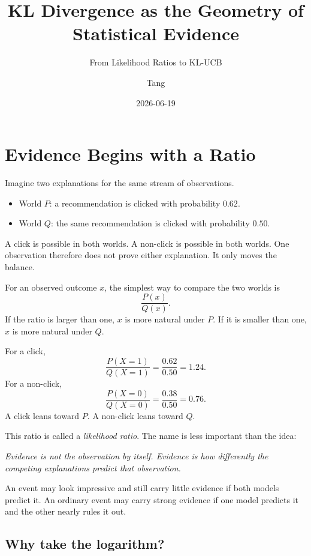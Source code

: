 \documentclass[en,nofont,11pt]{elegantbook}
\title{KL Divergence as the Geometry of Statistical Evidence}
\subtitle{From Likelihood Ratios to KL-UCB}
\author{Tang}
\institute{Tang's Machine Learning Blog}
\date{2026-06-19}
\begin{document}
\maketitle
\frontmatter
\tableofcontents
\mainmatter

\chapter{Evidence Begins with a Ratio}

Imagine two explanations for the same stream of observations.

\begin{itemize}
\item World $P$: a recommendation is clicked with probability $0.62$.
\item World $Q$: the same recommendation is clicked with probability $0.50$.
\end{itemize}

A click is possible in both worlds. A non-click is possible in both worlds. One observation therefore does not prove either explanation. It only moves the balance.

For an observed outcome $x$, the simplest way to compare the two worlds is
\[
\frac{P(x)}{Q(x)}.
\]
If the ratio is larger than one, $x$ is more natural under $P$. If it is smaller than one, $x$ is more natural under $Q$.

For a click,
\[
\frac{P(X=1)}{Q(X=1)}
=
\frac{0.62}{0.50}
=
1.24.
\]
For a non-click,
\[
\frac{P(X=0)}{Q(X=0)}
=
\frac{0.38}{0.50}
=
0.76.
\]
A click leans toward $P$. A non-click leans toward $Q$.

This ratio is called a \emph{likelihood ratio}. The name is less important than the idea:

\begin{center}
\emph{Evidence is not the observation by itself. Evidence is how differently the competing explanations predict that observation.}
\end{center}

\begin{keyidea}
An event may look impressive and still carry little evidence if both models predict it. An ordinary event may carry strong evidence if one model predicts it and the other nearly rules it out.
\end{keyidea}

\section{Why take the logarithm?}
\end{document}
